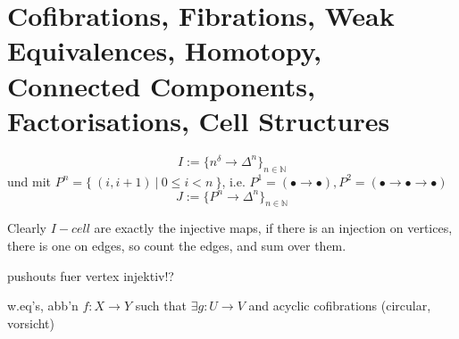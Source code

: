 \documentclass[a4paper]{book}
\theoremstyle{definition}
\newcommand{\N}{\mathbb{N}}
\begin{document}
\section{Cofibrations, Fibrations, Weak Equivalences, Homotopy, Connected Components, Factorisations, Cell Structures}

\[I:=\{n^\delta \rightarrow \Delta^n\}_{n\in\N}\]
und mit $P^n = \{~(i,i+1)~|~0\leq i < n~\}$, i.e. $P^1 = ( \bullet \rightarrow \bullet ), P^2 = ( \bullet \rightarrow \bullet \rightarrow \bullet )$
\[J:=\{P^n \rightarrow \Delta^n\}_{n\in\N}\]

Clearly $I-cell$ are exactly the injective maps, if there is an injection on vertices, there is one on edges, so count the edges,
and sum over them.

pushouts fuer vertex injektiv!?

w.eq's, abb'n $f\colon X\rightarrow Y$ such that $\exists g\colon U \rightarrow V$ and acyclic cofibrations (circular, vorsicht)
\end{document}
